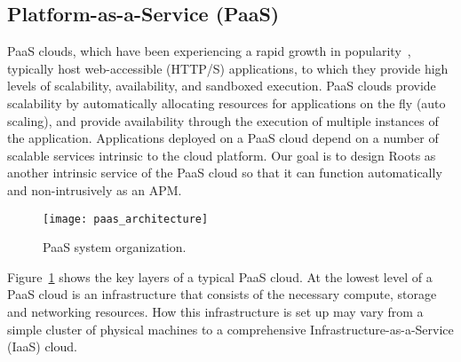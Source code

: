\subsection{Platform-as-a-Service (PaaS)}

PaaS clouds, which have been experiencing a rapid growth in 
popularity~\cite{paas-growth,paas-growth2},
typically host web-accessible (HTTP/S) applications, to which they provide
high levels of scalability, availability, and sandboxed execution. PaaS
clouds provide scalability by automatically allocating resources for
applications on the fly (auto scaling), and provide availability through the
execution of multiple instances of the application. Applications deployed on
a PaaS cloud depend on a number of scalable services intrinsic to the 
cloud platform. Our goal is to design Roots as another intrinsic service of the PaaS cloud
so that it can function automatically and non-intrusively as an APM.

\begin{figure}
\centering
\texttt{[image: paas\_architecture]}
\caption{PaaS system organization.}
\label{fig:paas_architecture}
\end{figure}

Figure~\ref{fig:paas_architecture} shows the key layers of a typical PaaS cloud. 
At the lowest level of a PaaS cloud is an infrastructure that consists of the necessary compute, storage
and networking resources. How this infrastructure is set up may vary from a simple cluster of physical 
machines to a comprehensive Infrastructure-as-a-Service (IaaS) cloud. 


